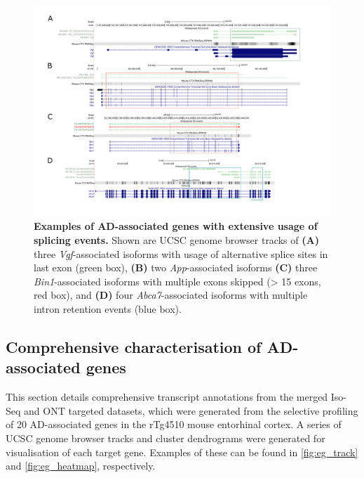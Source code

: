 \begin{landscape}
\begin{figure}[]
	\centering
	\includegraphics[page=1,trim={0 1.5cm 0 1cm},clip,scale = 0.85]{Figures/TargetGenesASExamples.pdf}
	\captionsetup{width=1.25\textwidth}
	\caption[Examples of AD-associated genes with extensive usage of splicing events]%
	{\textbf{Examples of AD-associated genes with extensive usage of splicing events.} Shown are UCSC genome browser tracks of \textbf{(A)} three \textit{Vgf}-associated isoforms with usage of alternative splice sites in last exon (green box), \textbf{(B)} two \textit{App}-associated isoforms \textbf{(C)} three \textit{Bin1}-associated isoforms with multiple exons skipped (> 15 exons, red box), and \textbf{(D)} four \textit{Abca7}-associated isoforms with multiple intron retention events (blue box).}
	\label{fig: AS_Examples}
\end{figure}
\end{landscape}
\restoregeometry

\clearpage
\subsection{Comprehensive characterisation of AD-associated genes} 
\label{ch6: target_gene_annotation}
This section details comprehensive transcript annotations from the merged Iso-Seq and ONT targeted datasets, which were generated from the selective profiling of 20 AD-associated genes in the rTg4510 mouse entorhinal cortex. A series of UCSC genome browser tracks and cluster dendrograms were generated for visualisation of each target gene. Examples of these can be found in \cref{fig:eg_track} and \cref{fig:eg_heatmap}, respectively. 

